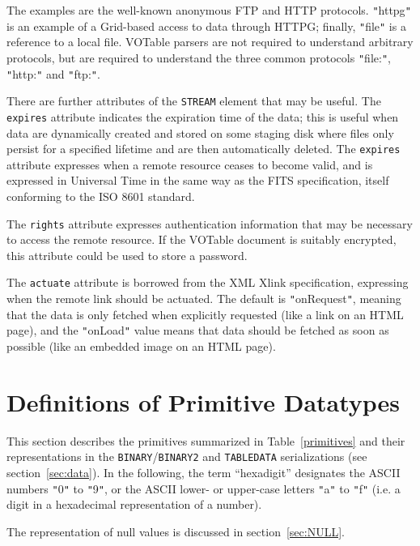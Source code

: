 \documentclass[11pt,a4paper]{ivoa}
\def\Aref#1{section~\ref{#1}}
\def\Tref#1{Table~\ref{#1}}
\let\fg=\color
\def\attr#1{{\tt{\fg{DarkRed}#1}}}
\def\elem#1{{\tt{\fg{DarkRed}#1}}}
\def\literalvalue#1{{\tt"}{{\fg{DarkPurple}#1}}{\tt"}}
\begin{document}
{The examples are the well-known anonymous FTP and HTTP protocols.
\literalvalue{httpg} is an example of a Grid-based access to data through HTTPG;
finally, \literalvalue{file} is a reference to a local file.
VOTable parsers are not required to understand arbitrary protocols,
but are required to understand the  three common protocols
\literalvalue{file:}, \literalvalue{http:} and \literalvalue{ftp:}.

There are further attributes of the {\elem{STREAM}}
element that may be useful. The {\attr{expires}}
attribute indicates the expiration time of the data;
this is useful when data are dynamically created and stored
on some staging disk where files only persist for a specified
lifetime and are then automatically deleted.
The {\attr{expires}}
attribute expresses when a remote resource ceases to become valid,
and is expressed in Universal Time in the same way as the FITS
specification, itself conforming to the ISO 8601 standard.

The {\attr{rights}}
attribute expresses authentication information that may be necessary
to access the remote resource. If  the VOTable document is suitably
encrypted, this attribute could be used to store a password.

The {\attr{actuate}}
attribute is borrowed from the XML Xlink specification, expressing
when the remote link should be actuated. The default is {\literalvalue{onRequest}},
meaning that the data is only fetched when explicitly requested (like
a link on an HTML page), and the {\literalvalue{onLoad}}
value means that data should be fetched as soon as possible (like an
embedded image on an HTML page).

\section{Definitions of Primitive Datatypes}
\label{sec:datatypes}

This section describes the primitives summarized in
\Tref{primitives}
and their representations in the \elem{BINARY}/\elem{BINARY2}
and \elem{TABLEDATA} serializations
(see \Aref{sec:data}).
In the following, the term ``hexadigit'' designates the ASCII numbers
\literalvalue{0} to \literalvalue{9}, or the ASCII lower- or upper-case letters
\literalvalue{a} to \literalvalue{f} (i.e. a digit in a hexadecimal representation
of a number).

The representation of null values is discussed in \Aref{sec:NULL}.

}
\end{document}
